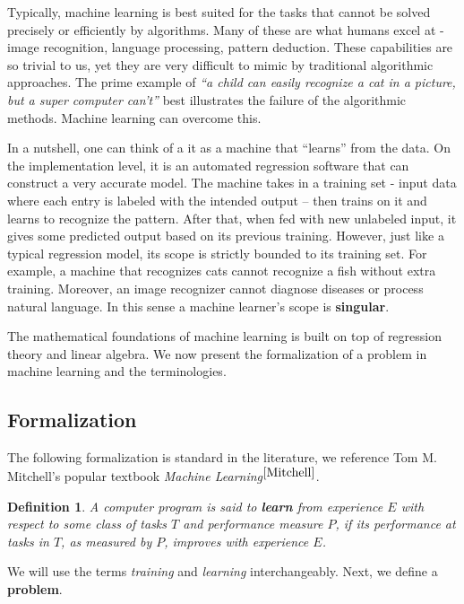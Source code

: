 \documentclass[12pt]{article}  %
\newtheorem{definition}{Definition}
\begin{document}
Typically, machine learning is best suited for the tasks that cannot be solved precisely or efficiently by algorithms. Many of these are what humans excel at - image recognition, language processing, pattern deduction. These capabilities are so trivial to us, yet they are very difficult to mimic by traditional algorithmic approaches. The prime example of {\em ``a child can easily recognize a cat in a picture, but a super computer can't''} best illustrates the failure of the algorithmic methods. Machine learning can overcome this.

In a nutshell, one can think of a it as a machine that ``learns'' from the data. On the implementation level, it is an automated regression software that can construct a very accurate model. The machine takes in a training set - input data where each entry is labeled with the intended output – then trains on it and learns to recognize the pattern. After that, when fed with new unlabeled input, it gives some predicted output based on its previous training. However, just like a typical regression model, its scope is strictly bounded to its training set. For example, a machine that recognizes cats cannot recognize a fish without extra training. Moreover, an image recognizer cannot diagnose diseases or process natural language. In this sense a machine learner's scope is {\bf singular}.

The mathematical foundations of machine learning is built on top of regression theory and linear algebra. We now present the formalization of a problem in machine learning and the terminologies.








\subsection{Formalization}

The following formalization is standard in the literature, we reference Tom M. Mitchell's popular textbook {\em Machine Learning}$^{\ref{Mitchell}}$.


\begin{definition}
A computer program is said to {\bf \em learn} from experience $E$ with respect to some class of tasks $T$ and performance measure $P$, if its performance at tasks in $T$, as measured by $P$, improves with experience $E$.
\end{definition}

We will use the terms {\em training} and {\em learning} interchangeably. Next, we define a {\bf problem}.
\end{document}
